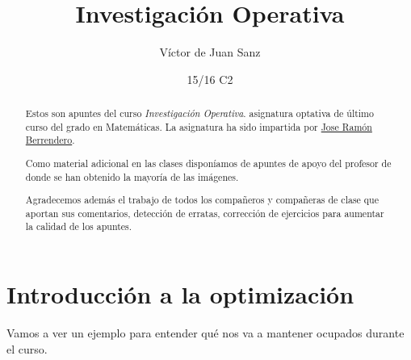 \documentclass[palatino]{apuntes}
\title{Investigación Operativa}
\author{Víctor de Juan Sanz}
\date{15/16 C2}
\begin{document}
\begin{abstract}
Estos son apuntes del curso \textit{Investigación Operativa}. asignatura optativa de último curso del grado en Matemáticas. La asignatura ha sido impartida por \href{http://www.uam.es/joser.berrendero}{Jose Ramón Berrendero}. 


Como material adicional en las clases disponíamos de apuntes de apoyo del profesor de donde se han obtenido la mayoría de las imágenes.

Agradecemos además el trabajo de todos los compañeros y compañeras de clase que aportan sus comentarios, detección de erratas, corrección de ejercicios para aumentar la calidad de los apuntes.

\end{abstract}
\pagestyle{plain}
\maketitle

\tableofcontents
\newpage

\section{Introducción a la optimización}

Vamos a ver un ejemplo para entender qué nos va a mantener ocupados durante el curso.
\end{document}
